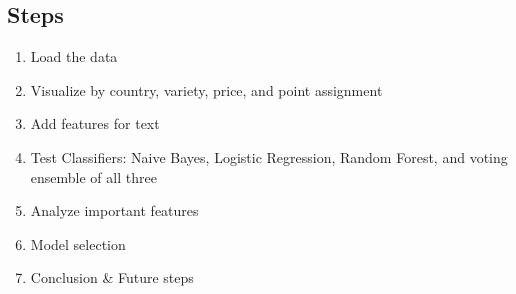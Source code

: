 \documentclass[11pt]{article}
\providecommand{\tightlist}{%
      \setlength{\itemsep}{0pt}\setlength{\parskip}{0pt}}
\begin{document}
    \subsection{Steps}\label{steps}

\begin{enumerate}
\def\labelenumi{\arabic{enumi}.}
\tightlist
\item
  Load the data
\item
  Visualize by country, variety, price, and point assignment
\item
  Add features for text
\item
  Test Classifiers: Naive Bayes, Logistic Regression, Random Forest, and
  voting ensemble of all three
\item
  Analyze important features
\item
  Model selection
\item
  Conclusion \& Future steps
\end{enumerate}
\end{document}
